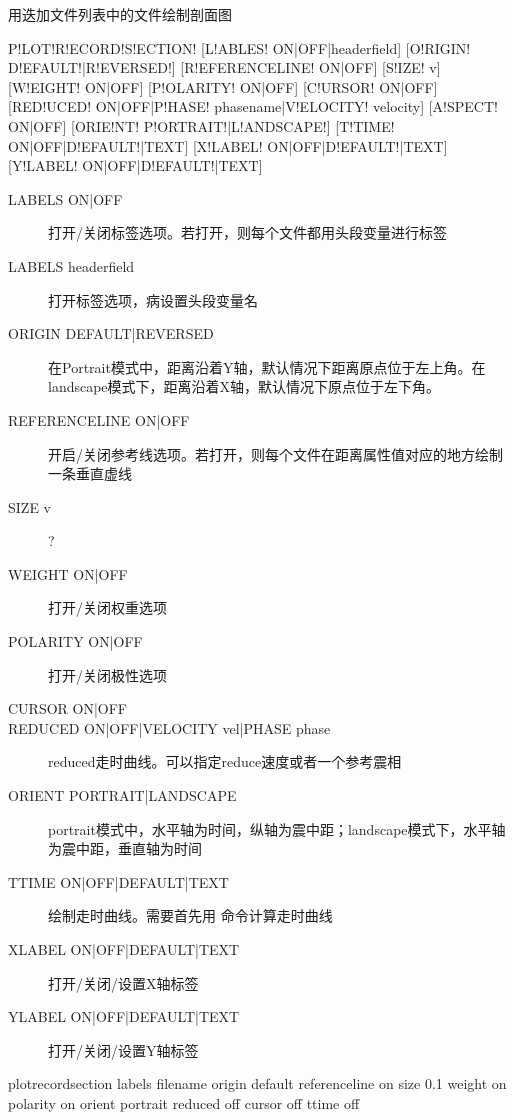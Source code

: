 \label{sss:plotrecordsection}

用迭加文件列表中的文件绘制剖面图

\begin{SACSTX}
P!LOT!R!ECORD!S!ECTION! [L!ABLES! ON|OFF|headerfield]
    [O!RIGIN! D!EFAULT!|R!EVERSED!] [R!EFERENCELINE! ON|OFF] [S!IZE! v]
    [W!EIGHT! ON|OFF] [P!OLARITY! ON|OFF]
    [C!URSOR! ON|OFF] [RED!UCED! ON|OFF|P!HASE! phasename|V!ELOCITY! velocity]
    [A!SPECT! ON|OFF] [ORIE!NT! P!ORTRAIT!|L!ANDSCAPE!]
    [T!TIME! ON|OFF|D!EFAULT!|TEXT]
    [X!LABEL! ON|OFF|D!EFAULT!|TEXT] [Y!LABEL! ON|OFF|D!EFAULT!|TEXT]
\end{SACSTX}

\begin{description}
\item [LABELS ON|OFF] 打开/关闭标签选项。若打开，则每个文件都用头段变量进行标签
\item [LABELS headerfield] 打开标签选项，病设置头段变量名
\item [ORIGIN DEFAULT|REVERSED] 在Portrait模式中，距离沿着Y轴，默认情况下距离原点位于左上角。在landscape模式下，距离沿着X轴，默认情况下原点位于左下角。
\item [REFERENCELINE ON|OFF] 开启/关闭参考线选项。若打开，则每个文件在距离属性值对应的地方绘制一条垂直虚线
\item [SIZE v] ?
\item [WEIGHT ON|OFF] 打开/关闭权重选项
\item [POLARITY ON|OFF] 打开/关闭极性选项
\item [CURSOR ON|OFF]
\item [REDUCED ON|OFF|VELOCITY vel|PHASE phase] reduced走时曲线。可以指定reduce速度或者一个参考震相
\item [ORIENT PORTRAIT|LANDSCAPE] portrait模式中，水平轴为时间，纵轴为震中距；landscape模式下，水平轴为震中距，垂直轴为时间
\item [TTIME ON|OFF|DEFAULT|TEXT] 绘制走时曲线。需要首先用  命令计算走时曲线
\item [XLABEL ON|OFF|DEFAULT|TEXT] 打开/关闭/设置X轴标签
\item [YLABEL ON|OFF|DEFAULT|TEXT] 打开/关闭/设置Y轴标签
\end{description}

\begin{SACDFT}
plotrecordsection labels filename origin default referenceline on
    size 0.1 weight on polarity on orient portrait reduced off
    cursor off ttime off
\end{SACDFT}

